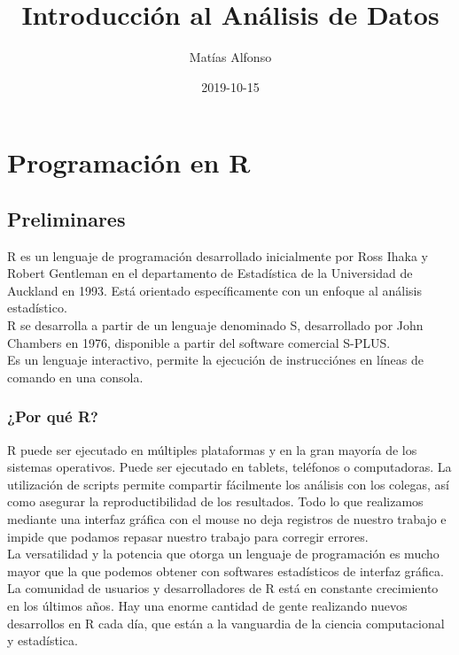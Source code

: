 \documentclass[spanish,]{book}
\title{Introducción al Análisis de Datos}
\author{Matías Alfonso}
\date{2019-10-15}
\begin{document}
\maketitle

{
\setcounter{tocdepth}{1}
\tableofcontents
}
\part{Programación en R}\label{part-programacion-en-r}

\chapter{Preliminares}\label{prelim}

R es un lenguaje de programación desarrollado inicialmente por Ross
Ihaka y Robert Gentleman en el departamento de Estadística de la
Universidad de Auckland en 1993. Está orientado específicamente con un
enfoque al análisis estadístico.\\
R se desarrolla a partir de un lenguaje denominado S, desarrollado por
John Chambers en 1976, disponible a partir del software comercial
S-PLUS.\\
Es un lenguaje interactivo, permite la ejecución de instrucciónes en
líneas de comando en una consola.

\section{¿Por qué R?}\label{por-que-r}

R puede ser ejecutado en múltiples plataformas y en la gran mayoría de
los sistemas operativos. Puede ser ejecutado en tablets, teléfonos o
computadoras. La utilización de scripts permite compartir fácilmente los
análisis con los colegas, así como asegurar la reproductibilidad de los
resultados. Todo lo que realizamos mediante una interfaz gráfica con el
mouse no deja registros de nuestro trabajo e impide que podamos repasar
nuestro trabajo para corregir errores.\\
La versatilidad y la potencia que otorga un lenguaje de programación es
mucho mayor que la que podemos obtener con softwares estadísticos de
interfaz gráfica.\\
La comunidad de usuarios y desarrolladores de R está en constante
crecimiento en los últimos años. Hay una enorme cantidad de gente
realizando nuevos desarrollos en R cada día, que están a la vanguardia
de la ciencia computacional y estadística.
\end{document}
